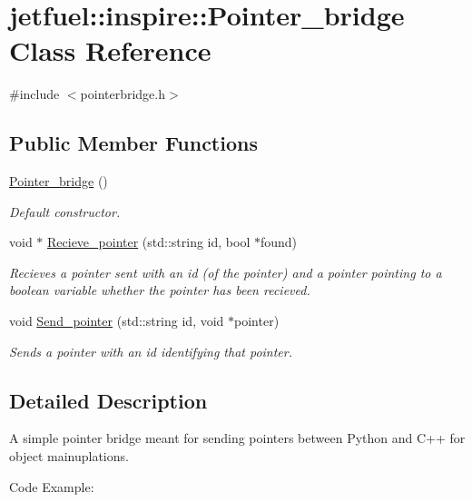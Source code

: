 \hypertarget{classjetfuel_1_1inspire_1_1Pointer__bridge}{}\section{jetfuel\+:\+:inspire\+:\+:Pointer\+\_\+bridge Class Reference}
\label{classjetfuel_1_1inspire_1_1Pointer__bridge}


{\ttfamily \#include $<$pointerbridge.\+h$>$}

\subsection*{Public Member Functions}
\begin{DoxyCompactItemize}
\item 
\hyperlink{classjetfuel_1_1inspire_1_1Pointer__bridge_a8b799f891596d70d98ee577ef87a6781}{Pointer\+\_\+bridge} ()
\begin{DoxyCompactList}\small\item\em Default constructor. \end{DoxyCompactList}\item 
void $\ast$ \hyperlink{classjetfuel_1_1inspire_1_1Pointer__bridge_a031c7d904e4e86096e2c399f8db8a1f8}{Recieve\+\_\+pointer} (std\+::string id, bool $\ast$found)
\begin{DoxyCompactList}\small\item\em Recieves a pointer sent with an id (of the pointer) and a pointer pointing to a boolean variable whether the pointer has been recieved. \end{DoxyCompactList}\item 
void \hyperlink{classjetfuel_1_1inspire_1_1Pointer__bridge_a805c0fa469cca7d6acdfd285b92aa9c8}{Send\+\_\+pointer} (std\+::string id, void $\ast$pointer)
\begin{DoxyCompactList}\small\item\em Sends a pointer with an id identifying that pointer. \end{DoxyCompactList}\end{DoxyCompactItemize}


\subsection{Detailed Description}
A simple pointer bridge meant for sending pointers between Python and C++ for object mainuplations.

Code Example\+:

